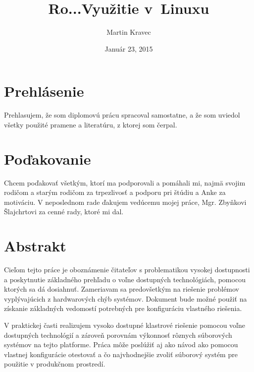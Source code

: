 \documentclass[12pt, a4paper, oneside]{book} %
\begin{document}
\title{Ro...Využitie  v~Linuxu}
\author{Martin Kravec}
\date{Január 23, 2015}

\frontmatter

\maketitle \thispagestyle{empty} \emptydoublepage

\chapter*{Prehlásenie}
Prehlasujem, že som diplomovú prácu spracoval samostatne, a že som uviedol všetky použité pramene a literatúru, z ktorej som čerpal.

\emptydoublepage

\chapter*{Poďakovanie}
Chcem poďakovať všetkým, ktorí ma podporovali a pomáhali mi, najmä svojim rodičom a starým rodičom za trpezlivosť a podporu pri štúdiu a Anke za motiváciu. V neposlednom rade ďakujem vedúcemu mojej práce, Mgr. Zbyňkovi Šlajchrtovi za cenné rady, ktoré mi dal.

\emptydoublepage


\chapter*{Abstrakt}
Cieľom tejto práce je oboznámenie čitateľov s problematikou vysokej dostupnosti a poskytnutie základného prehľadu o voľne dostupných technológiách, pomocou ktorých sa dá dosiahnuť. Zameriavam sa predovšetkým na riešenie problémov vyplývajúcich z hardwarových chýb systémov. Dokument bude možné použiť na získanie základných vedomostí potrebných pre konfiguráciu vlastného riešenia.

V praktickej časti realizujem vysoko dostupné klastrové riešenie pomocou voľne dostupných technológií a zároveň porovnám výkonnosť rôznych súborových systémov na tejto platforme. Práca môže poslúžiť aj ako návod ako pomocou vlastnej konfigurácie otestovať a čo najvhodnejšie zvoliť súborový systém pre použitie v produkčnom prostredí.
\end{document}
